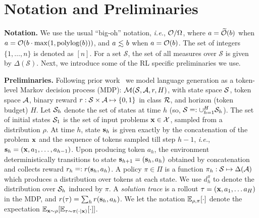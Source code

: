 \vspace{-0.2cm}
\section{Notation and Preliminaries}
\label{sec:prelim}
\vspace{-0.1cm}

\textbf{Notation.} We use the usual ``big-oh'' notation, \textit{i.e.},  ${\mathcal{O}}/\Omega$, where $a = \widetilde{{\mathcal{O}}}(b)$ when $a = {\mathcal{O}}(b \cdot \max(1, \mathrm{polylog}(b)))$, and $a \lsim b$ when $a = {\mathcal{O}}(b)$. 
The set of integers $\{1,\ldots,n\}$ is denoted as $[n]$. For a set $\mathcal{S}$, the set of all measures over $\mathcal{S}$ is given by $\Delta(\mathcal{S})$. Next, we introduce some of the RL specific preliminaries we use.

\textbf{Preliminaries.} Following prior work~\cite{kazemnejad2024vineppo,setlur2024rl} we model language generation as a token-level Markov decision process (MDP): ${\mathcal{M}}({\mathcal{S}}, {\mathcal{A}}, r, H)$, with state space ${\mathcal{S}}$, token space ${\mathcal{A}}$, binary reward $r: {\mathcal{S}} \times {\mathcal{A}} \mapsto \{0, 1\}$ in class ${\mathcal{R}}$, 
and horizon (token budget) $H$. Let ${\mathcal{S}}_h$ denote the set of states at time $h$ (so,   ${\mathcal{S}}  \mathrel{\mathop=}: \cup_{h=1}^H {\mathcal{S}}_h$). The set of initial states ${\mathcal{S}}_1$ is the set of input problems $\mathbf{x} \in \mathcal{X}$, sampled from a distribution $\rho$. At time $h$, state $\mathbf{s}_h$ is given exactly by the concatenation of the problem $\mathbf{x}$ and the sequence of tokens sampled till step $h-1$, \textit{i.e.}, $\mathbf{s}_h = (\mathbf{x}, a_1, \ldots, a_{h-1})$. Upon producing token $a_h$, the environment deterministically transitions to state $\mathbf{s}_{h+1} = (\mathbf{s}_h, a_h)$ obtained by concatenation and collects reward $r_h \mathrel{\mathop=}: r(\mathbf{s}_h, a_h)$. 
A policy $\pi \in \Pi$ is a function $\pi_h : {\mathcal{S}} \mapsto \Delta({\mathcal{A}})$ which produces a distribution over tokens at each state. We use $d^\pi_h$ to denote the distribution over ${\mathcal{S}}_h$ induced by $\pi$. A \emph{solution trace} is a rollout  $\tau = (\mathbf{x}, a_1, \dots a_H)$ in the MDP, and $r(\tau) = \sum_{h} r(\mathbf{s}_h, a_h)$. We let the notation $\mathbb{E}_{\rho,\pi} [\cdot]$ denote the expectation $\mathbb{E}_{\mathbf{x} \sim \rho} [\mathbb{E}_{\tau \sim \pi(\cdot\mid\mathbf{x})} [\cdot]]$.


\vspace{-0.2cm}
